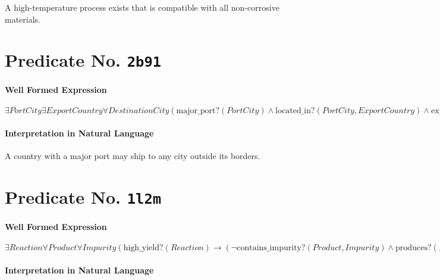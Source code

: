 \documentclass[11pt]{article}
\begin{document}
A high-temperature process exists that is compatible with all non-corrosive materials.



\section{Predicate No. \texttt{2b91}}
\label{sec:org1764bc2}

\paragraph*{Well Formed Expression}
\label{sec:orgff4c0f1}

\(\exists \mathit{PortCity} \exists \mathit{ExportCountry} \forall \mathit{DestinationCity} (\mathrm{major\_port?}(\mathit{PortCity}) \land \mathrm{located\_in?}(\mathit{PortCity},\mathit{ExportCountry}) \land \mathrm{exports\_to?}(\mathit{ExportCountry}, \mathit{DestinationCity}) \land \neg \mathrm{located\_in?}(\mathit{DestinationCity},\mathit{ExportCountry}))\)

\paragraph*{Interpretation in Natural Language}
\label{sec:org1db55dd}

A country with a major port may ship to any city outside its borders.



\section{Predicate No. \texttt{1l2m}}
\label{sec:org6773af5}

\paragraph*{Well Formed Expression}
\label{sec:org760159a}

\(\exists \mathit{Reaction} \forall \mathit{Product} \forall \mathit{Impurity} (\mathrm{high\_yield?}(\mathit{Reaction}) \rightarrow (\neg \mathrm{contains\_impurity?}(\mathit{Product}, \mathit{Impurity}) \land \mathrm{produces?}(\mathit{Reaction}, \mathit{Product})))\)

\paragraph*{Interpretation in Natural Language}
\label{sec:org1e0ef02}
\end{document}
